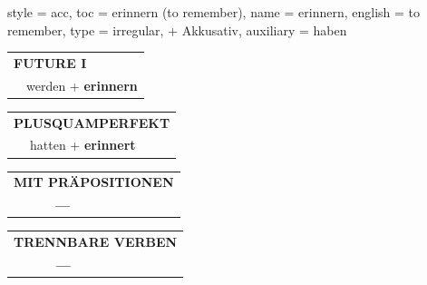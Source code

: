 \begin{verbentry}{
  style = {acc},
  toc = {erinnern (to remember)},
  name = {erinnern},
  english = {to remember},
  type = {irregular, + Akkusativ},
  auxiliary = {haben}
}
\begin{tabular}{rl}
    \multicolumn{2}{l}{\textbf{FUTURE I} }\\
   & werden + \textbf{erinnern}\\
 
  \end{tabular}
\hfill
   \begin{tabular}{rl}
      \multicolumn{2}{l}{\textbf{PLUSQUAMPERFEKT}}\\
   & hatten + \textbf{erinnert}\\
  \end{tabular}
  
  \vspace{10pt}

\begin{tabular}{lll}
\multicolumn{3}{l}{\textbf{MIT PRÄPOSITIONEN}}\\
& \textbf{---} & \\
\end{tabular}
\hfill
\begin{tabular}{lll}
\multicolumn{3}{l}{\textbf{TRENNBARE VERBEN}}\\
& \textbf{---} & \\
\end{tabular}

  \vspace{-5pt}
\end{verbentry}

